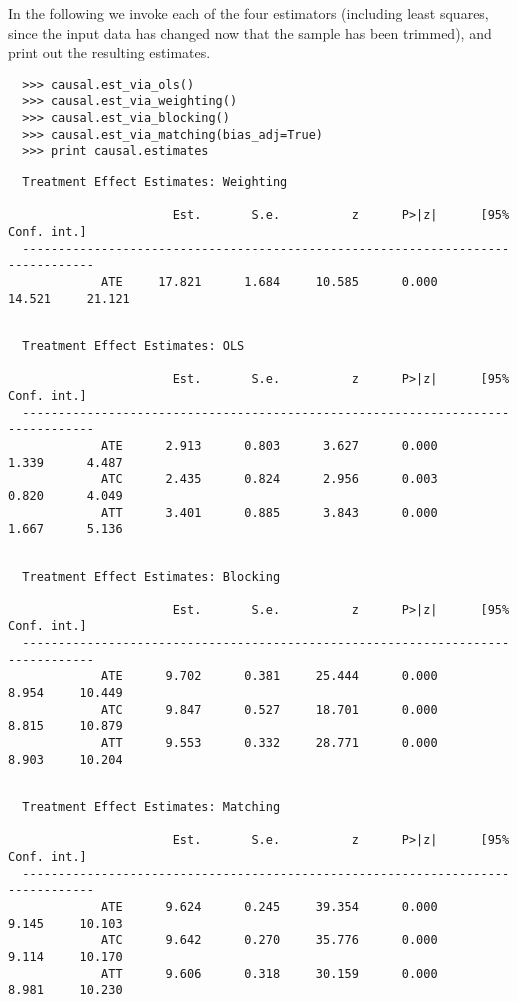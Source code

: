 \documentclass[12pt]{article}
\theoremstyle{definition}
\theoremstyle{definition}
\theoremstyle{definition}
\theoremstyle{remark}
\begin{document}
In the following we invoke each of the four estimators (including least squares, since the input data has changed now that the sample has been trimmed), and print out the resulting estimates.
\begin{verbatim}
  >>> causal.est_via_ols()
  >>> causal.est_via_weighting()
  >>> causal.est_via_blocking()
  >>> causal.est_via_matching(bias_adj=True)
  >>> print causal.estimates
\end{verbatim}
\begin{verbatim}
  Treatment Effect Estimates: Weighting
  
                       Est.       S.e.          z      P>|z|      [95% Conf. int.]
  --------------------------------------------------------------------------------
             ATE     17.821      1.684     10.585      0.000     14.521     21.121
  
\end{verbatim}
\begin{verbatim}
  Treatment Effect Estimates: OLS
  
                       Est.       S.e.          z      P>|z|      [95% Conf. int.]
  --------------------------------------------------------------------------------
             ATE      2.913      0.803      3.627      0.000      1.339      4.487
             ATC      2.435      0.824      2.956      0.003      0.820      4.049
             ATT      3.401      0.885      3.843      0.000      1.667      5.136
  
\end{verbatim}
\begin{verbatim}
  Treatment Effect Estimates: Blocking
  
                       Est.       S.e.          z      P>|z|      [95% Conf. int.]
  --------------------------------------------------------------------------------
             ATE      9.702      0.381     25.444      0.000      8.954     10.449
             ATC      9.847      0.527     18.701      0.000      8.815     10.879
             ATT      9.553      0.332     28.771      0.000      8.903     10.204
  
\end{verbatim}
\begin{verbatim}
  Treatment Effect Estimates: Matching
  
                       Est.       S.e.          z      P>|z|      [95% Conf. int.]
  --------------------------------------------------------------------------------
             ATE      9.624      0.245     39.354      0.000      9.145     10.103
             ATC      9.642      0.270     35.776      0.000      9.114     10.170
             ATT      9.606      0.318     30.159      0.000      8.981     10.230
\end{verbatim}
\end{document}

